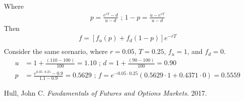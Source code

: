 \documentclass[12pt]{article}
\begin{document}
Where
\begin{align*}
p=\frac{e^{rT}-d}{u-d} \text{ ; }
1-p=\frac{u-e^{rT}}{u-d}
\end{align*}
Then
\begin{align*}
f=[f_{u}(p)+f_{d}(1-p)]e^{-rT}\\
\end{align*}
Consider the same scenario, where $r=0.05$, $T=0.25$, $f_{u}=1$, and $f_{d}=0$.\\
\begin{align*}
u&=1+\frac{(110-100)}{100}=1.10 \text{ ; }
d=1+\frac{(90-100)}{100}=0.90\\
p&=\frac{e^{0.05\cdot0.25}-0.9}{1.1-0.9}=0.5629 \text{ ; }
f=e^{-0.05\cdot0.25}(0.5629\cdot1+0.4371\cdot0)=0.5559
\end{align*}

\newpage
\begin{thebibliography}{1}
\bibitem{} Hull, John C. {\em Fundamentals of Futures and Options Markets.} 2017.
\end{thebibliography}
\end{document}
